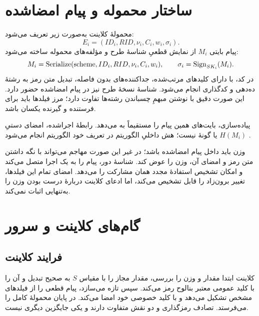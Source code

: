 \section{ساختار محموله و پیام امضاشده}
محمولۀ کلاینت به‌صورت زیر تعریف می‌شود:
\begin{equation}
E_i=(ID_i,RID,\nu_i,C_i,w_i,\sigma_i).
\label{eq:sbhe-envelope}
\end{equation}
پیام بایتی $M_i$ از نمایش قطعیِ شناسۀ طرح و مؤلفه‌های محموله ساخته می‌شود:
\begin{equation}
M_i=\operatorname{Serialize}(\mathrm{scheme},ID_i,RID,\nu_i,C_i,w_i),
\qquad \sigma_i=\operatorname{Sign}_{SK_i}(M_i).
\label{eq:sbhe-signature}
\end{equation}
در کد،  با  دارای کلیدهای مرتب‌شده، جداکننده‌های بدون فاصله، تبدیل متن رمز به رشتۀ ده‌دهی و کدگذاری  انجام می‌شود. شناسۀ نسخۀ طرح  نیز در پیام امضاشده حضور دارد. این صورت دقیق با نوشتن مبهمِ چسباندن رشته‌ها تفاوت دارد؛ مرز فیلدها باید برای فرستنده و گیرنده یکسان باشد.

پیاده‌سازی، بایت‌های همین پیام را مستقیماً به  می‌دهد. رابطۀ اجراشده، امضای دستیِ $H(M_i)$ یا گونۀ  نیست؛ هش داخلیِ الگوریتم  در تعریف خود الگوریتم انجام می‌شود \cite{ed25519}.

وزن باید داخل پیام امضاشده باشد؛ در غیر این صورت مهاجم می‌تواند با نگه داشتن متن رمز و امضای آن، وزن را عوض کند. شناسۀ دور، پیام را به یک اجرا متصل می‌کند و  امکان تشخیص استفادۀ مجدد همان مشارکت را می‌دهد. امضای تمام این فیلدها، تغییر برون‌زاد را قابل تشخیص می‌کند، اما ادعای کلاینت دربارۀ درست بودن وزن را به‌تنهایی اثبات نمی‌کند.

\section{گام‌های کلاینت و سرور}
\subsection{فرایند کلاینت}
کلاینت ابتدا مقدار و وزن را بررسی، مقدار مجاز را با مقیاس $S$ به صحیح تبدیل و آن را با کلید عمومی معتبر بنالوح رمز می‌کند. سپس  تازه می‌سازد، پیام قطعی را از فیلدهای مشخص تشکیل می‌دهد و با کلید خصوصی خود امضا می‌کند. در پایان محمولۀ کامل را می‌فرستد. تصادف رمزگذاری و  دو نقش متفاوت دارند و یکی جایگزین دیگری نیست.

